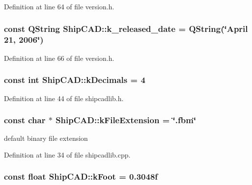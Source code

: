 Definition at line 64 of file version.\-h.

\hypertarget{namespaceShipCAD_a833fc6d39d2f0fd7fa31d0a691b0b726}{
\subsubsection[{k\-\_\-released\-\_\-date}]{\setlength{\rightskip}{0pt plus 5cm}const Q\-String Ship\-C\-A\-D\-::k\-\_\-released\-\_\-date = Q\-String(\char`\"{}April 21, 2006\char`\"{})}}\label{namespaceShipCAD_a833fc6d39d2f0fd7fa31d0a691b0b726}


Definition at line 66 of file version.\-h.

\hypertarget{namespaceShipCAD_ac88ffd27e117a3e612997a36a5d4616d}{
\subsubsection[{k\-Decimals}]{\setlength{\rightskip}{0pt plus 5cm}const int Ship\-C\-A\-D\-::k\-Decimals = 4}}\label{namespaceShipCAD_ac88ffd27e117a3e612997a36a5d4616d}


Definition at line 44 of file shipcadlib.\-h.

\hypertarget{namespaceShipCAD_a6461e4d91e555f0c732b53f8998b325d}{
\subsubsection[{k\-File\-Extension}]{\setlength{\rightskip}{0pt plus 5cm}const char $\ast$ Ship\-C\-A\-D\-::k\-File\-Extension = \char`\"{}.fbm\char`\"{}}}\label{namespaceShipCAD_a6461e4d91e555f0c732b53f8998b325d}
default binary file extension 

Definition at line 34 of file shipcadlib.\-cpp.

\hypertarget{namespaceShipCAD_a8c1484188fed1e735c5a94f64a6817ab}{
\subsubsection[{k\-Foot}]{\setlength{\rightskip}{0pt plus 5cm}const float Ship\-C\-A\-D\-::k\-Foot = 0.\-3048f}}\label{namespaceShipCAD_a8c1484188fed1e735c5a94f64a6817ab}


